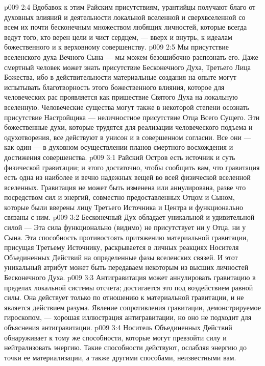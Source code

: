 \vs p009 2:4 Вдобавок к этим Райским присутствиям, урантийцы получают благо от духовных влияний и деятельности локальной вселенной и сверхвселенной со всем их почти бесконечным множеством любящих личностей, которые всегда ведут того, кто верен цели и чист сердцем, --- вверх и внутрь, к идеалам божественного и к верховному совершенству.
\vs p009 2:5 Мы  присутствие вселенского духа Вечного Сына --- мы можем безошибочно распознать его. Даже смертный человек может знать присутствие Бесконечного Духа, Третьего Лица Божества, ибо в действительности материальные создания на опыте могут испытывать благотворность этого божественного влияния, которое для человеческих рас проявляется как пришествие Святого Духа на локальную вселенную. Человеческие существа могут также в некоторой степени осознать присутствие Настройщика --- неличностное присутствие Отца Всего Сущего. Эти божественные духи, которые трудятся для реализации человеческого подъема и одухотворения, все действуют в унисон и в совершенном согласии. Все они --- как один --- в духовном осуществлении планов смертного восхождения и достижения совершенства.
\vs p009 3:1 Райский Остров есть источник и суть физической гравитации; и этого достаточно, чтобы сообщить вам, что гравитация есть одна из наиболее  и вечно надежных вещей во всей физической вселенной вселенных. Гравитация не может быть изменена или аннулирована, разве что посредством сил и энергий, совместно предоставленных Отцом и Сыном, которые были вверены лицу Третьего Источника и Центра и функционально связаны с ним.
\vs p009 3:2 \pc Бесконечный Дух обладает уникальной и удивительной силой ---  Эта сила функционально (видимо) не присутствует ни у Отца, ни у Сына. Эта способность противостоять притяжению материальной гравитации, присущая Третьему Источнику, раскрывается в личных реакциях Носителя Объединенных Действий на определенные фазы вселенских связей. И этот уникальный атрибут может быть передаваем некоторым из высших личностей Бесконечного Духа.
\vs p009 3:3 \pc Антигравитация может аннулировать гравитацию в пределах локальной системы отсчета; достигается это под воздействием равной силы. Она действует только по отношению к материальной гравитации, и не является действием разума. Явление сопротивления гравитации, демонстрируемое гироскопом, --- хорошая иллюстрация  антигравитации, но оно не подходит для объяснения  антигравитации.
\vs p009 3:4 Носитель Объединенных Действий обнаруживает к тому же способности, которые могут превзойти силу и нейтрализовать энергию. Такие способности действуют, ослабляя энергию до точки ее материализации, а также другими способами, неизвестными вам.
